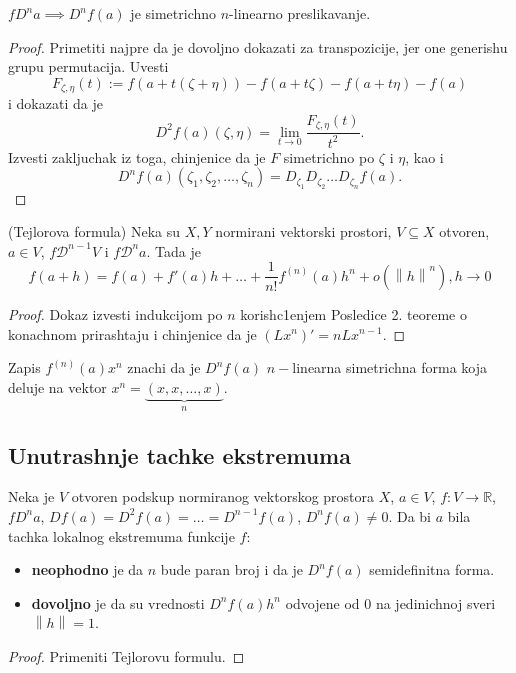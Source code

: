 \documentclass[a4paper,12pt]{article}
\newcommand{\R}{\mathbb{R}}
\newcommand{\psj}{\subseteq}
\newcommand{\norm}[1]{\left\lVert#1\right\rVert}
\begin{document}
\begin{tvr}
	$fD^n a \implies D^nf(a)$ je simetrichno $n$-linearno preslikavanje.
\end{tvr}
\begin{proof}
	Primetiti najpre da je dovoljno dokazati za transpozicije, jer one generishu grupu permutacija.
	Uvesti \[F_{\zeta, \eta} (t) := f(a +t(\zeta + \eta)) - f(a + t\zeta) - f(a + t\eta) - f(a)\] i 
	dokazati da je \[ D^2f(a)(\zeta, \eta) = \lim_{t\to 0} \dfrac{F_{\zeta, \eta} (t)}{t^2} .\] 
	Izvesti zakljuchak iz toga, chinjenice da je $F$ simetrichno po $\zeta$ i $\eta$, kao i 
	\[ D^nf(a) (\zeta_1, \zeta_2, \dotso, \zeta_n) = D_{\zeta_1}D_{\zeta_2}\dotso D_{\zeta_n} f(a).\]
\end{proof}

\begin{tma}
(Tejlorova formula) Neka su $X, Y$ normirani vektorski prostori, $V \psj X$ otvoren, $a \in V$, $f \mathcal{D}^{n-1}V$ i $f\mathcal{D}^n a$. Tada je 
\[f(a+h) = f(a) + f'(a)h + \dots + \frac{1}{n!} f^{(n)}(a) h^n + o(\norm{h}^n), h \to 0\]
\end{tma}
\begin{proof}
Dokaz izvesti indukcijom po $n$ korish\-c1e\-njem Posledice 2. teoreme o konachnom prirashtaju i chinjenice da je $(Lx^n)' = n Lx^{n-1}$.
\end{proof}

\begin{nap}
	Zapis $f^{(n)}(a) x^n$ znachi da je $D^nf(a)$ $n-$linearna simetrichna forma koja deluje na vektor $x^n = \underbrace{(x, x, \dotso, x)}_{n}$.
\end{nap}

\subsection{Unutrashnje tachke ekstremuma}

\begin{tvr}
	Neka je $V$ otvoren podskup normiranog vektorskog prostora $X$, $a \in V$, $f:V\to \R$, $f D^n a$,
	$Df(a) = D^2f(a) = \dotso = D^{n-1}f(a)$, $D^n f(a) \neq 0 $. Da bi $a$ bila tachka lokalnog ekstremuma
    funkcije $f$:
	\begin{itemize}
		\item \textbf{neophodno} je da $n$ bude paran broj i da je $D^nf(a)$ semidefinitna forma.
		\item \textbf{dovoljno} je da su vrednosti $D^nf(a)h^n$ odvojene od $0$ na jedinichnoj sveri $\norm h = 1$.
	\end{itemize}
\end{tvr}
\begin{proof}
	Primeniti Tejlorovu formulu.
\end{proof}
\end{document}
